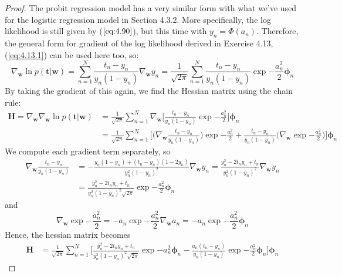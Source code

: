 \begin{proof}
    The probit regression model has a very similar form with what
    we've used for the logistic regression model in Section 4.3.2. 
    More specifically, the log likelihood is still given by ($\ref{eq:4.90}$),
    but this time with $y_n = \Phi(a_n)$. Therefore, the general form for gradient of the log 
    likelihood derived in Exercise 4.13, (\ref{eq:4.13.1}) can be used
    here too, so:
    \[
        \nabla_\mathbf{w} \ln p(\mathbf{t} | \mathbf{w}) 
        = \sum_{n=1}^{N} \frac{t_n - y_n}{y_n(1 - y_n)} \nabla_\mathbf{w} y_n
        = \frac{1}{\sqrt{2\pi}} \sum_{n=1}^{N} \frac{t_n - y_n}{y_n(1 - y_n)} 
        \exp{-\frac{a_n^2}{2}}\bm{\phi}_n
    \] 
    By taking the gradient of this again, we find the Hessian matrix
    using the chain rule:
    \begin{align*}
        \mathbf{H} 
        = \nabla_\mathbf{w} \nabla_\mathbf{w} \ln p(\mathbf{t} | \mathbf{w}) 
        &= \frac{1}{\sqrt{2\pi}} \sum_{n=1}^{N}
        \nabla_\mathbf{w}\bigg[\frac{t_n - y_n}{y_n(1 - y_n)}\exp{-\frac{a_n^2}{2}}\bigg]\bm{\phi}_n \\
        &= \frac{1}{\sqrt{2\pi}} \sum_{n=1}^{N} \bigg[
            \bigg(\nabla_\mathbf{w} \frac{t_n - y_n}{y_n(1 - y_n)}\bigg)
            \exp{-\frac{a_n^2}{2}} + \frac{t_n - y_n}{y_n(1 - y_n)} 
        \bigg(\nabla_\mathbf{w} \exp{-\frac{a_n^2}{2}}\bigg)\bigg]\bm{\phi}_n
    \end{align*}
    We compute each gradient term separately, so
    \begin{align*}
        \nabla_\mathbf{w} \frac{t_n - y_n}{y_n(1 - y_n)}
        &= -\frac{y_n(1 - y_n) + (t_n - y_n)(1 - 2y_n)}
        {y_n^2(1 - y_n)^2} \nabla_\mathbf{w} y_n
        = \frac{y_n^2 - 2t_ny_n + t_n}{y_n^2(1 - y_n)^2}\nabla_\mathbf{w} y_n \\
        &= \frac{y_n^2 - 2t_ny_n + t_n}{y_n^2(1 - y_n)^2\sqrt{2\pi}}\exp{-\frac{a_n^2}{2}}
        \bm{\phi}_n
    \end{align*}
    and
    \[
        \nabla_\mathbf{w} \exp{-\frac{a_n^2}{2}} 
        = -a_n\exp{-\frac{a_n^2}{2}} \nabla_\mathbf{w} a_n
        = -a_n\exp{-\frac{a_n^2}{2}} \bm{\phi}_n
    \] 
    Hence, the hessian matrix becomes
    \begin{align*}
        \mathbf{H} 
        &= \frac{1}{\sqrt{2\pi}} \sum_{n=1}^{N} \bigg[
        \frac{y_n^2 - 2t_ny_n + t_n}{y_n^2(1 - y_n)^2\sqrt{2\pi}}\exp{-a_n^2}\bm{\phi}_n
        - \frac{a_n(t_n - y_n)}{y_n(1 - y_n)}\exp{-\frac{a_n^2}{2}}\bm{\phi}_n\bigg] \bm{\phi}_n
    \end{align*}
\end{proof}

